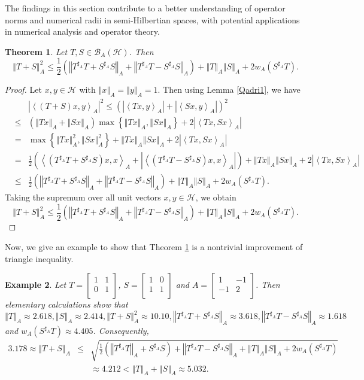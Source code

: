 \documentclass{article}
\newcommand{\bra}[1]{\left(#1\right)}
\newcommand{\seqA}[1]{{\left<#1\right>}_{A}}
\newcommand{\normA}[1]{{\left\Vert#1\right\Vert}_{A}}
\newcommand{\abs}[1]{\left\vert#1\right\vert}
\newcommand{\set}[1]{\left\{#1\right\}}
\newcommand {\Sa}{S^{\sharp_{A}}}
\newcommand {\h}{\mathcal{H}}
\newcommand {\Ta}{T^{\sharp_{A}}}
\renewcommand {\b}{\mathcal{B}}
\newtheorem{theorem}{Theorem}[section]
\newtheorem{example}[theorem]{Example}
\begin{document}
The findings in this section contribute to a better understanding of operator norms and numerical radii in semi-Hilbertian spaces, with potential applications in numerical analysis and operator theory.
\begin{theorem}\label{theorem4.1} Let $T,S\in\b_A(\h)$. Then
$$\normA{T+S}^2\leq \frac{1}{2}\bra{\normA{\Ta T+\Sa S}+\normA{\Ta T-\Sa S}}+\normA{T}\normA{S}+2w_A(\Sa T).$$
\end{theorem}
\begin{proof} Let $x,y\in\h$ with $\normA{x}=\normA{y}=1$. Then using Lemma \ref{Qadri1}, we have
\begin{eqnarray*}
  &&\abs{\seqA{(T+S)x,y}}^2 \leq \bra{\abs{\seqA{Tx,y}}+\abs{\seqA{Sx,y}}}^2 \\
   &\leq&\bra{\normA{Tx}+\normA{Sx}}\max\set{\normA{Tx},\normA{Sx}}+2\abs{\seqA{Tx,Sx}}\\
   &=&\max\set{\normA{Tx}^2,\normA{Sx}^2}+\normA{Tx}\normA{Sx}+2\abs{\seqA{Tx,Sx}}\\
   &=&\frac{1}{2}\bra{\seqA{\bra{\Ta T+\Sa S}x,x}+\abs{\seqA{\bra{\Ta T-\Sa S}x,x}}}+
   \normA{Tx}\normA{Sx}+2\abs{\seqA{Tx,Sx}}\\
   &\leq& \frac{1}{2}\bra{\normA{\Ta T+\Sa S}+\normA{\Ta T-\Sa S}}+\normA{T}\normA{S}+2w_A(\Sa T).
\end{eqnarray*}
Taking the supremum over all unit vectors $x,y\in\h$, we obtain
$$\normA{T+S}^2\leq \frac{1}{2}\bra{\normA{\Ta T+\Sa S}+\normA{\Ta T-\Sa S}}+\normA{T}\normA{S}+2w_A(\Sa T).$$
\end{proof}
Now, we give an example to show that Theorem \ref{theorem4.1} is a nontrivial improvement of
triangle inequality.
\begin{example} Let $T=\begin{bmatrix} 1& 1 \\ 0 & 1 \\ \end{bmatrix}$, $S=\begin{bmatrix} 1& 0 \\ 1& 1 \\ \end{bmatrix}$
and $A=\begin{bmatrix} 1& -1 \\ -1 & 2 \\ \end{bmatrix}$. Then elementary calculations show that
$$\normA{T}\approx 2.618, \normA{S}\approx2.414, \normA{T+S}^2\approx10.10,\normA{\Ta T+\Sa S}\approx3.618,\normA{\Ta T-\Sa S}\approx1.618$$
and $w_A(\Sa T)\approx4.405$. Consequently,
\begin{eqnarray*}
 3.178\approx \normA{T+S} &\leq&\sqrt{\frac{1}{2}\bra{\normA{\Ta T}+\Sa S}+\normA{\Ta T-\Sa S}+\normA{T}\normA{S}+2w_A(\Sa T)}\\
 &&\approx
4.212  < \normA{T}+\normA{S}\approx 5.032.
\end{eqnarray*}
\end{example}
\end{document}

